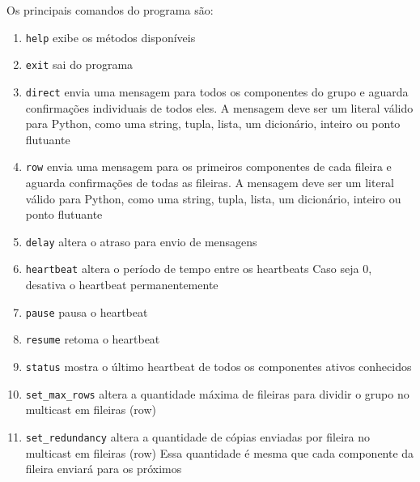 \documentclass[12pt,twocolumn]{article}
\begin{document}
			Os principais comandos do programa são: 
			\begin{enumerate}
				\item \texttt{help} exibe os métodos disponíveis
				
				\item \texttt{exit} sai do programa
				
				\item \texttt{direct} envia uma mensagem para todos os componentes do grupo e aguarda confirmações individuais de todos eles.
				A mensagem deve ser um literal válido para Python, como uma string, tupla, lista, um dicionário, inteiro ou ponto flutuante
				
				\item \texttt{row} envia uma mensagem para os primeiros componentes de cada fileira e aguarda confirmações de todas as fileiras.
				A mensagem deve ser um literal válido para Python, como uma string, tupla, lista, um dicionário, inteiro ou ponto flutuante
				
				\item \texttt{delay} altera o atraso para envio de mensagens
				
				\item \texttt{heartbeat} altera o período de tempo entre os heartbeats
				Caso seja 0, desativa o heartbeat permanentemente
				
				\item \texttt{pause}  pausa o heartbeat
				
				\item \texttt{resume}  retoma o heartbeat 
				
				\item \texttt{status}  mostra o último heartbeat de todos os componentes ativos conhecidos 
				
				\item \texttt{set\_max\_rows}  altera a quantidade máxima de fileiras para dividir o grupo no multicast em fileiras (row)
				
				\item \texttt{set\_redundancy}  altera a quantidade de cópias enviadas por fileira no multicast em fileiras (row)
				Essa quantidade é mesma que cada componente da fileira enviará para os próximos 								
				
			\end{enumerate}
			
				
\end{document}

